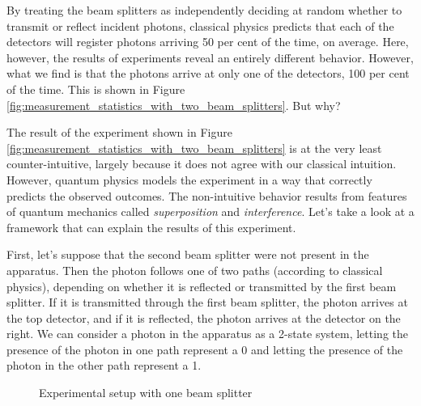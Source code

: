 \documentclass[11pt, oneside]{article}   	%
\begin{document}
\bigskip
\noindent
By treating the beam splitters as independently deciding at random whether to transmit or reflect incident photons, classical physics predicts that each of the detectors will register photons arriving 50 per cent of the time, on average. Here, however, the results of experiments reveal an entirely different behavior. However, what we find is that the photons arrive at only one of the detectors, 100 per cent of the time. This is shown in Figure \ref{fig:measurement_statistics_with_two_beam_splitters}. But why?


\bigskip
\noindent
The result of the  experiment  shown in Figure  \ref{fig:measurement_statistics_with_two_beam_splitters} is at the very least counter-intuitive, largely because it does not agree with our classical intuition. However, quantum physics models the experiment in a way that correctly predicts the observed outcomes. The non-intuitive behavior results from features of quantum mechanics called \emph{superposition} and \emph{interference}. Let's take a look at a framework that can  explain the results of this experiment.

\bigskip
\noindent
First, let's suppose that the second beam splitter were not present in the apparatus. Then the photon follows one of two paths (according to classical physics), depending on whether it is reflected or transmitted by the first beam splitter. If it is transmitted through the first beam splitter, the photon arrives at the top detector, and if it is reflected, the photon arrives at the detector on the right. We can consider a photon in the apparatus as a 2-state system, letting the presence of the photon in one path represent a 0 and letting the presence of the photon in the other path represent a 1.

\begin{figure}
\caption{Experimental setup with one beam splitter}
\label{fig:measurement_statistics_with_one_beam_splitter}
\end{figure}
\end{document}
